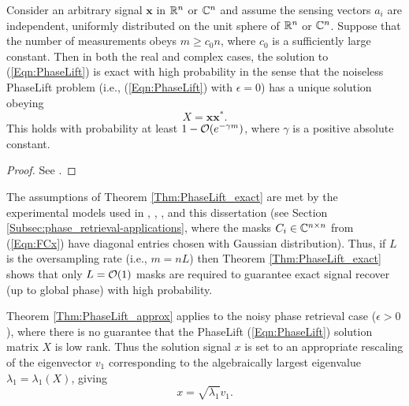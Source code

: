 \begin{theorem}  \label{Thm:PhaseLift_exact}
Consider an arbitrary signal $\mathbf{x}$ in ${\mathbb R}^n$ or ${\mathbb C}^n$ and assume the sensing vectors $a_i$ are independent, uniformly distributed on the unit sphere of ${\mathbb R}^n$ or ${\mathbb C}^n$.  Suppose that the number of measurements obeys $m \geq c_0 n$, where $c_0$ is a sufficiently large constant. Then in both the real and complex cases, the solution to (\ref{Eqn:PhaseLift}) is exact with high probability in the sense that the noiseless PhaseLift problem (i.e., (\ref{Eqn:PhaseLift}) with $\epsilon = 0$) has a unique solution obeying
\[
X = \mathbf{x}\mathbf{x}^*.
\]
This holds with probability at least $1 - {\mathcal O}(e^{-\gamma m})$, where $\gamma$ is a positive absolute constant.
\end{theorem}
\begin{proof}
See \cite[Section 2]{candes2014solving}.
\end{proof}




The assumptions of Theorem \ref{Thm:PhaseLift_exact} are met by the experimental models used in \cite{DBLP:journals/siamis/CandesESV13}, \cite{candes2013phaselift}, \cite{DBLP:journals/siamsc/FriedlanderM16}, and this dissertation (see Section \ref{Subsec:phase_retrieval-applications}, where the masks $C_i \in {\mathbb C}^{n \times n}$ from (\ref{Eqn:FCx}) have diagonal entries chosen with Gaussian distribution).  Thus, if $L$ is the oversampling rate (i.e., $m = nL$) then Theorem \ref{Thm:PhaseLift_exact} shows that only $L = {\mathcal O}(1)$ masks are required to guarantee exact signal recover (up to global phase) with high probability.




Theorem \ref{Thm:PhaseLift_approx} applies to the  noisy phase retrieval case ($\epsilon > 0$), where there is no guarantee that the PhaseLift (\ref{Eqn:PhaseLift}) solution matrix $X$ is low rank.  Thus the solution signal $x$ is set to an appropriate rescaling of the eigenvector $v_1$ corresponding to the algebraically largest eigenvalue $\lambda_1 = \lambda_1 (X)$, giving
\begin{equation}  			\label{Eqn:PhaseLift_solution_signal}
x = \sqrt{\lambda_1}v_1.
\end{equation}


